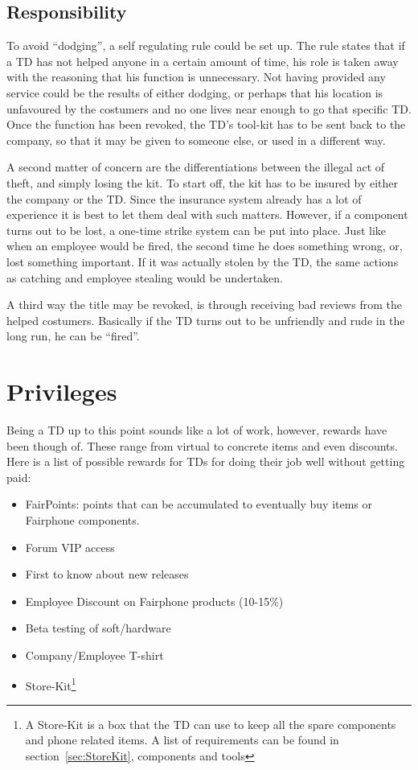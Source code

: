 \documentclass[final]{scrreprt} %
\begin{document}
\subsection{Responsibility}
To avoid ``dodging'', a self regulating rule could be set up. The rule states that if a TD has not helped anyone in a certain amount of time, his role is taken away with the reasoning that his function is unnecessary. Not having provided any service could be the results of either dodging, or perhaps that his location is unfavoured by the costumers and no one lives near enough to go that specific TD. Once the function has been revoked, the TD's tool-kit has to be sent back to the company, so that it may be given to someone else, or used in a different way.

A second matter of concern are the differentiations between the illegal act of theft, and simply losing the kit. To start off, the kit has to be insured by either the company or the TD. Since the insurance system already has a lot of experience it is best to let them deal with such matters. However, if a component turns out to be lost, a one-time strike system can be put into place. Just like when an employee would be fired, the second time he does something wrong, or, lost something important. If it was actually stolen by the TD, the same actions as catching and employee stealing would be undertaken. 

A third way the title may be revoked, is through receiving bad reviews from the helped costumers. Basically if the TD turns out to be unfriendly and rude in the long run, he can be ``fired''.

\section{Privileges} 
Being a TD up to this point sounds like a lot of work, however, rewards have been though of. These range from virtual to concrete items and even discounts. Here is a list of possible rewards for TDs for doing their job well without getting paid:

\begin{itemize}
	\item FairPoints: points that can be accumulated to eventually buy items or Fairphone components.
	\item Forum VIP access
	\item First to know about new releases
	\item Employee Discount on Fairphone products (10-15\%)
	\item Beta testing of soft/hardware
	\item Company/Employee T-shirt
	\item Store-Kit\footnote{A Store-Kit is a box that the TD can use to keep all the spare components and phone related items. A list of requirements can be found in section~\ref{sec:StoreKit}, components and tools}
	\end{itemize}
\end{document}
